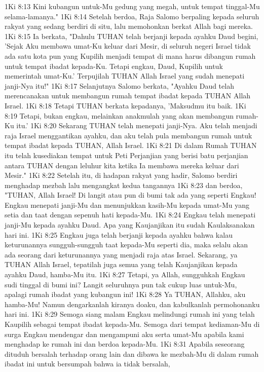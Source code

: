 1Ki 8:13  Kini kubangun untuk-Mu gedung yang megah, untuk tempat tinggal-Mu selama-lamanya."
1Ki 8:14  Setelah berdoa, Raja Salomo berpaling kepada seluruh rakyat yang sedang berdiri di situ, lalu memohonkan berkat Allah bagi mereka.
1Ki 8:15  Ia berkata, "Dahulu TUHAN telah berjanji kepada ayahku Daud begini, 'Sejak Aku membawa umat-Ku keluar dari Mesir, di seluruh negeri Israel tidak ada satu kota pun yang Kupilih menjadi tempat di mana harus dibangun rumah untuk tempat ibadat kepada-Ku. Tetapi engkau, Daud, Kupilih untuk memerintah umat-Ku.' Terpujilah TUHAN Allah Israel yang sudah menepati janji-Nya itu!"
1Ki 8:17  Selanjutnya Salomo berkata, "Ayahku Daud telah merencanakan untuk membangun rumah tempat ibadat kepada TUHAN Allah Israel.
1Ki 8:18  Tetapi TUHAN berkata kepadanya, 'Maksudmu itu baik.
1Ki 8:19  Tetapi, bukan engkau, melainkan anakmulah yang akan membangun rumah-Ku itu.'
1Ki 8:20  Sekarang TUHAN telah menepati janji-Nya. Aku telah menjadi raja Israel menggantikan ayahku, dan aku telah pula membangun rumah untuk tempat ibadat kepada TUHAN, Allah Israel.
1Ki 8:21  Di dalam Rumah TUHAN itu telah kusediakan tempat untuk Peti Perjanjian yang berisi batu perjanjian antara TUHAN dengan leluhur kita ketika Ia membawa mereka keluar dari Mesir."
1Ki 8:22  Setelah itu, di hadapan rakyat yang hadir, Salomo berdiri menghadap mezbah lalu mengangkat kedua tangannya
1Ki 8:23  dan berdoa, "TUHAN, Allah Israel! Di langit atau pun di bumi tak ada yang seperti Engkau! Engkau menepati janji-Mu dan menunjukkan kasih-Mu kepada umat-Mu yang setia dan taat dengan sepenuh hati kepada-Mu.
1Ki 8:24  Engkau telah menepati janji-Mu kepada ayahku Daud. Apa yang Kaujanjikan itu sudah Kaulaksanakan hari ini.
1Ki 8:25  Engkau juga telah berjanji kepada ayahku bahwa kalau keturunannya sungguh-sungguh taat kepada-Mu seperti dia, maka selalu akan ada seorang dari keturunannya yang menjadi raja atas Israel. Sekarang, ya TUHAN Allah Israel, tepatilah juga semua yang telah Kaujanjikan kepada ayahku Daud, hamba-Mu itu.
1Ki 8:27  Tetapi, ya Allah, sungguhkah Engkau sudi tinggal di bumi ini? Langit seluruhnya pun tak cukup luas untuk-Mu, apalagi rumah ibadat yang kubangun ini!
1Ki 8:28  Ya TUHAN, Allahku, aku hamba-Mu! Namun dengarkanlah kiranya doaku, dan kabulkanlah permohonanku hari ini.
1Ki 8:29  Semoga siang malam Engkau melindungi rumah ini yang telah Kaupilih sebagai tempat ibadat kepada-Mu. Semoga dari tempat kediaman-Mu di surga Engkau mendengar dan mengampuni aku serta umat-Mu apabila kami menghadap ke rumah ini dan berdoa kepada-Mu.
1Ki 8:31  Apabila seseorang dituduh bersalah terhadap orang lain dan dibawa ke mezbah-Mu di dalam rumah ibadat ini untuk bersumpah bahwa ia tidak bersalah,

